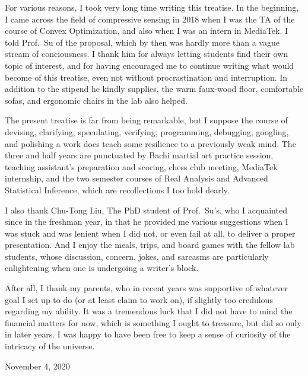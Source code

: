 \starttitle [title={Acknowledgement}]

For various reasons, I took very long time writing this treatise.
In the beginning, I came across the field of compressive sensing in 2018 when I was the TA of the course of Convex Optimization, and also when I was an intern in MediaTek.
I told Prof.\ Su of the proposal, which by then was hardly more than a vague stream of conciousness.
I thank him for always letting students find their own topic of interest, and for having encouraged me to continue writing what would become of this treatise, even not without procrastination and interruption.
In addition to the stipend he kindly supplies, the warm faux-wood floor, comfortable sofas, and ergonomic chairs in the lab also helped.

The present treatise is far from being remarkable, but I suppose the course of devising, clarifying, speculating, verifying, programming, debugging, googling, and polishing a work does teach some resilience to a previously weak mind.
The three and half years are punctuated by Bachi martial art practice session, teaching assistant's preparation and scoring, chess club meeting, MediaTek internship, and the two semester courses of Real Analysis and Advanced Statistical Inference, which are recollections I too hold dearly.

I also thank Chu-Tong Liu, The PhD student of Prof.\ Su's, who I acquainted since in the freshman year, in that he provided me various suggestions when I was stuck and was lenient when I did not, or even fail at all, to deliver a proper presentation.
And I enjoy the meals, trips, and board games with the fellow lab students, whose discussion, concern, jokes, and sarcasms are particularly enlightening when one is undergoing a writer's block.

After all, I thank my parents, who in recent years was supportive of whatever goal I set up to do (or at least claim to work on), if slightly too credulous regarding my ability.
It was a tremendous luck that I did not have to mind the financial matters for now, which is something I ought to treasure, but did so only in later years.
I was happy to have been free to keep a sense of curiosity of the intricacy of the universe.

November 4, 2020

\stoptitle


